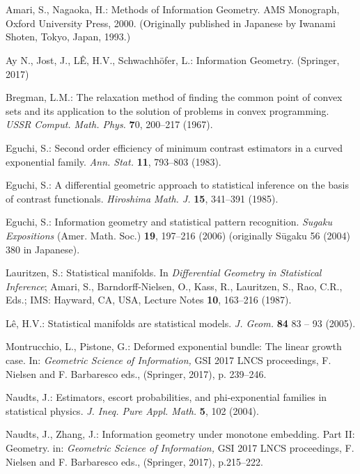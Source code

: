 \documentclass[graybox]{svmult}
\begin{document}
\section*{}
\begin{thebibliography}{99}


Amari, S., Nagaoka, H.: Methods of Information Geometry. AMS Monograph, 
Oxford University Press, 2000. (Originally published in Japanese by Iwanami 
Shoten, Tokyo, Japan, 1993.) 

Ay N., Jost, J., L\^E, H.V., Schwachh\"ofer, L.:
Information Geometry. (Springer, 2017)

Bregman, L.M.: The relaxation method of finding the common point of convex sets 
and its application to the solution of problems in convex programming. {\em USSR 
Comput. Math. Phys.} {\bf 7}0, 200--217 (1967).

Eguchi, S.: Second order efficiency of minimum contrast estimators in a curved 
exponential family. {\em Ann. Stat.} {\bf 11}, 793--803 (1983).

Eguchi, S.: A differential geometric approach to statistical inference on the 
basis of contrast functionals. {\em Hiroshima Math. J.}  {\bf 15}, 
341--391 (1985).

Eguchi, S.:
Information geometry and statistical pattern recognition.
{\em Sugaku Expositions} (Amer. Math. Soc.) {\bf 19},  197--216 (2006) 
(originally S{\rm \=u}gaku 56 (2004) 380  in Japanese).

Lauritzen, S.: Statistical manifolds. In {\em Differential Geometry in 
Statistical Inference}; Amari, S., Barndorff-Nielsen, O., Kass, R., Lauritzen, 
S., Rao, C.R., Eds.; IMS: Hayward, CA, USA,  Lecture Notes {\bf 10},  
163--216 (1987).

L\^e, H.V.:
Statistical manifolds are statistical models.
{\em J. Geom.} {\bf  84}  83 -- 93 (2005).


 Montrucchio, L., Pistone, G.:
Deformed exponential bundle: The linear growth case.
In: {\em Geometric Science of Information,} 
GSI 2017 LNCS proceedings,
F. Nielsen and F. Barbaresco eds., (Springer, 2017), p. 239--246.

Naudts, J.:
Estimators, escort probabilities, and phi-exponential families in statistical physics.
{\em J. Ineq. Pure Appl. Math.} {\bf 5}, 102 (2004).

Naudts, J., Zhang, J.: Information geometry under monotone embedding. Part II: Geometry.
in: {\em Geometric Science of Information,}
GSI 2017 LNCS proceedings,
F. Nielsen and F. Barbaresco eds., (Springer, 2017), p.215--222.


\end{thebibliography}
\end{document}
